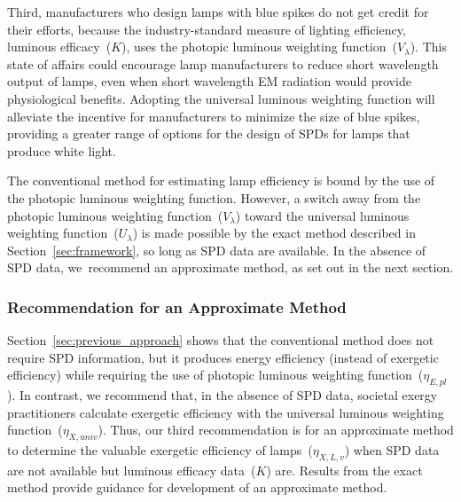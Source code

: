 \documentclass[energies,article,accept,moreauthors,pdftex]{Definitions/mdpi}\usepackage[]{graphicx}\usepackage[]{color}
\begin{document}
Third, 
manufacturers who design lamps with blue spikes
do not get credit for their efforts, because 
the industry-standard measure of lighting efficiency,
luminous efficacy~($K$), 
uses the photopic luminous weighting function~($V_\lambda$). 
This state of affairs could encourage lamp manufacturers to reduce short wavelength
output of lamps, even when short wavelength EM radiation would 
provide physiological benefits.
Adopting the universal luminous weighting function will alleviate 
the incentive for manufacturers to minimize the size of blue spikes,
providing a greater range of options for the design 
of SPDs for lamps that produce white light.

The conventional method for estimating lamp efficiency
is bound by the use of the photopic luminous weighting function.
However, a switch away from the photopic luminous weighting function~($V_\lambda$)
toward the universal luminous weighting function~($U_\lambda$) is
made possible by the exact method described in Section~\ref{sec:framework},
so long as SPD data are available.
In the absence of SPD data, 
\mbox{we recommend} an approximate method, 
as set out in the next section.


\subsubsection{Recommendation for an Approximate Method} 
\label{sec:approximate_method}

Section~\ref{sec:previous_approach} shows that the conventional method does not require SPD information, 
but it produces energy efficiency (instead of exergetic efficiency)
while requiring the use of photopic luminous weighting function~($\eta_{E,pl}$).
In contrast, we recommend that,
in the absence of SPD data,
societal exergy practitioners
calculate exergetic efficiency 
with the universal luminous weighting function~($\eta_{X,univ}$).
Thus, our third recommendation is for an approximate method to determine 
the valuable exergetic efficiency of lamps~($\eta_{X,L,v}$)
when SPD data are not available
but luminous efficacy data~($K$) are.
Results from the exact method provide guidance 
for development of an approximate method.
\end{document}
